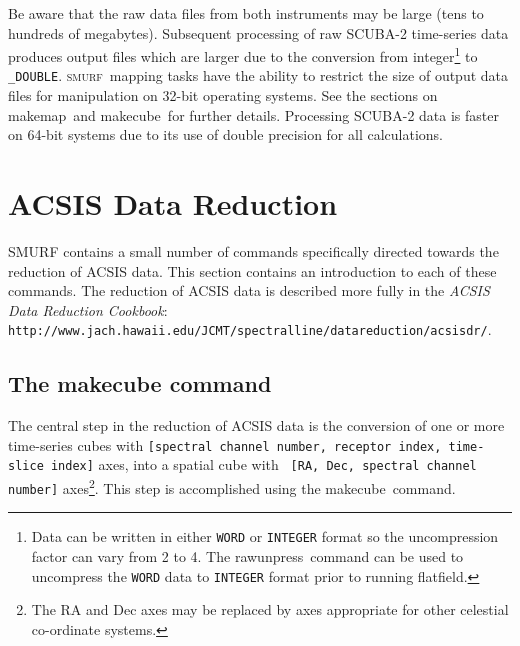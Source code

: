 \documentclass[twoside,11pt]{article}
\newcommand{\htmladdnormallink}[2]{#1}
\newcommand{\xref}[3]{#1}
\newcommand{\xlabel}[1]{}
\renewcommand{\_}{\texttt{\symbol{95}}}
\newcommand{\SMURF}{\textsc{smurf}}
\newcommand{\task}[1]{\textsf{#1}}
\newcommand{\makecube}{\xref{\task{makecube}}{sun258}{MAKECUBE}}
\newcommand{\rawunpress}{\xref{\task{rawunpress}}{sun258}{RAWUNPRESS}}
\newcommand{\flatfield}{\xref{\task{flatfield}}{sun258}{FLATFIELD}}
\newcommand{\makemap}{\xref{\task{makemap}}{sun258}{MAKEMAP}}
\begin{document}
Be aware that the raw data files from both instruments may be large
(tens to hundreds of megabytes). Subsequent processing of raw SCUBA-2
time-series data produces output files which are larger due to the
conversion from integer\footnote{Data can be written in either
  \texttt{\_WORD} or \texttt{\_INTEGER} format so the uncompression
  factor can vary from 2 to 4. The \rawunpress\ command can be used to
  uncompress the \texttt{\_WORD} data to \texttt{\_INTEGER} format
  prior to running \flatfield.}  to \verb+_DOUBLE+. \SMURF\ mapping
tasks have the ability to restrict the size of output data files for
manipulation on 32-bit operating systems. See the sections on
\makemap\ and \makecube\ for further details. Processing
SCUBA-2 data is faster on 64-bit systems due to its use of double
precision for all calculations.

\section{\xlabel{acsis}ACSIS Data Reduction\label{se:acsisdr}}

SMURF contains a small number of commands specifically directed towards
the reduction of ACSIS data. This section contains an introduction to
each of these commands. The reduction of ACSIS data is described
more fully in the {\em ACSIS Data Reduction Cookbook}:
\htmladdnormallink{\texttt{http://www.jach.hawaii.edu/JCMT/spectral\_line/data\_reduction/acsisdr/}}
{http://www.jach.hawaii.edu/JCMT/spectral_line/data_reduction/acsisdr/}.

\subsection{The makecube command}

The central step in the reduction of ACSIS data is the conversion of one
or more time-series cubes with {\tt [spectral channel number, receptor
index, time-slice index]} axes, into a spatial cube with {\tt
[RA, Dec, spectral channel number]} axes\footnote{The RA and Dec axes may
be replaced by axes appropriate for other celestial co-ordinate
systems.}. This step is accomplished using the \makecube\ command.
\end{document}
